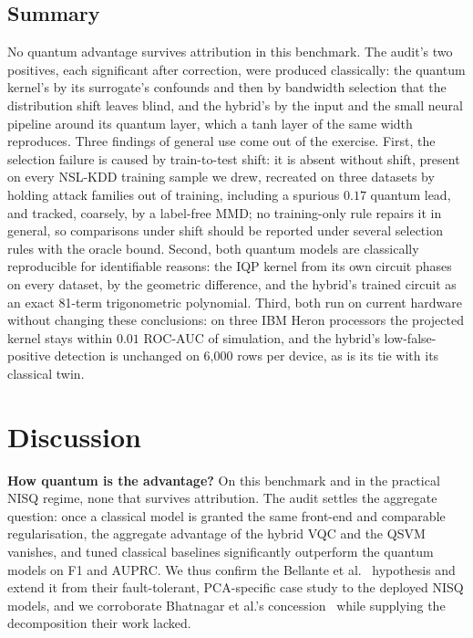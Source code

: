 \documentclass[preprint,11pt]{elsarticle}
\begin{document}
\subsection{Summary}\label{sec:ksum}
No quantum advantage survives attribution in this benchmark. The audit's two positives, each significant
after correction, were produced classically: the quantum kernel's by its surrogate's confounds and then by bandwidth selection that the distribution
shift leaves blind, and the hybrid's by
the input and the small neural pipeline around its quantum layer, which a tanh layer of the same width
reproduces. Three findings of general use come out of the exercise. First, the selection failure is caused by train-to-test shift: it is absent without shift, present on
every NSL-KDD training sample we drew, recreated on three datasets by holding attack
families out of training, including a spurious $0.17$ quantum lead, and tracked, coarsely, by a
label-free MMD; no training-only rule repairs it in general, so comparisons under shift should be
reported under several selection rules with the oracle bound. Second, both quantum models are classically
reproducible for identifiable reasons: the IQP kernel from its own circuit phases on every dataset, by the
geometric difference, and the hybrid's trained circuit as an exact 81-term trigonometric polynomial.
Third, both run on current hardware without changing these conclusions: on three IBM Heron processors the
projected kernel stays within $0.01$ ROC-AUC of simulation, and the hybrid's low-false-positive detection
is unchanged on 6{,}000 rows per device, as is its tie with its classical twin.

\section{Discussion}

\textbf{How quantum is the advantage?} On this benchmark and in the practical NISQ regime, none that
survives attribution. The audit settles the aggregate question: once a classical model is granted the same front-end and
comparable regularisation, the aggregate advantage of the hybrid VQC and the QSVM vanishes, and tuned
classical baselines significantly outperform the quantum models on F1 and AUPRC. We thus confirm the
Bellante et al.~\cite{bellante2025pca} hypothesis and extend it from their fault-tolerant, PCA-specific
case study to the deployed NISQ models, and we corroborate Bhatnagar et al.'s
concession~\cite{bhatnagar2026mqe} while supplying the decomposition their work lacked.
\end{document}
